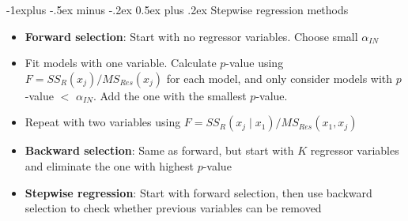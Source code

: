 \documentclass[frenchspacing,9pt,landscape,a4paper]{article}
\makeatletter
\renewcommand{\subsection}{\@startsection{subsection}{2}{0mm}%
                                {-1explus -.5ex minus -.2ex}%
                                {0.5ex plus .2ex}%
                                {\normalfont\normalsize\bfseries}}
\makeatother
\begin{document}
\begin{multicols}{3}
\subsection{Stepwise regression methods}

\begin{itemize}
	\item\textbf{Forward selection}: Start with no regressor variables. Choose small $\alpha_{IN}$
	\item Fit models with one variable. Calculate $p$-value using  $F=SS_R(x_j) /MS_{Res}(x_j)$ for each model, and only consider models with $p$-value $<$  $\alpha_{IN}$. Add the one with the smallest $p$-value. 
	\item Repeat with two variables using $F=SS_R(x_j\mid x_1) /MS_{Res}(x_1,x_j)$
	\item \textbf{Backward selection}: Same as forward, but start with $K$ regressor variables and eliminate the one with highest  $p$-value
	\item \textbf{Stepwise regression}: Start with forward selection, then use backward selection to check whether previous variables can be removed
\end{itemize}
\end{multicols}
\end{document}
